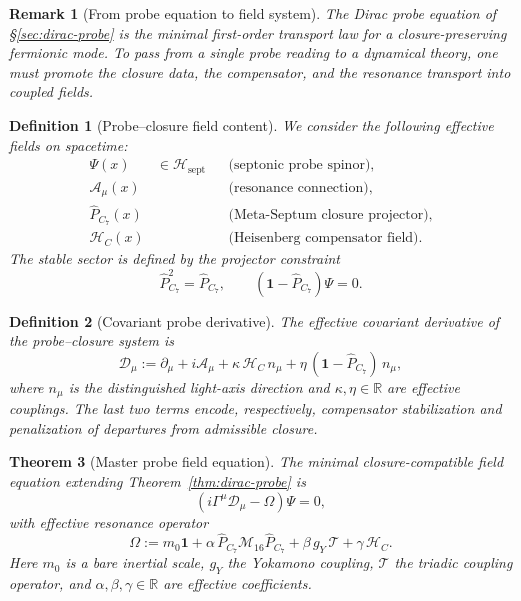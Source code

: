 \documentclass[12pt,a4paper]{article}
\newtheorem{theorem}{Theorem}[section]
\newtheorem{definition}[theorem]{Definition}
\newtheorem*{remark}{Remark}
\begin{document}
\begin{remark}[From probe equation to field system]
The Dirac probe equation of \S\ref{sec:dirac-probe} is the minimal
first-order transport law for a closure-preserving fermionic mode.
To pass from a single probe reading to a dynamical theory, one must
promote the closure data, the compensator, and the resonance transport
into coupled fields.
\end{remark}

\begin{definition}[Probe--closure field content]
We consider the following effective fields on spacetime:
\begin{align*}
  \Psi(x) &\in \mathcal H_{\mathrm{sept}}
    &&\text{(septonic probe spinor)},\\
  \mathcal A_\mu(x)
    &&&\text{(resonance connection)},\\
  \hat P_{C_7}(x)
    &&&\text{(Meta-Septum closure projector)},\\
  \mathcal H_C(x)
    &&&\text{(Heisenberg compensator field)}.
\end{align*}
The stable sector is defined by the projector constraint
\[
  \hat P_{C_7}^2 = \hat P_{C_7},
  \qquad
  (\mathbf 1-\hat P_{C_7})\Psi = 0.
\]
\end{definition}

\begin{definition}[Covariant probe derivative]
The effective covariant derivative of the probe--closure system is
\[
  \mathcal D_\mu
  :=
  \partial_\mu
  + i\mathcal A_\mu
  + \kappa\,\mathcal H_C\,n_\mu
  + \eta\,(\mathbf 1-\hat P_{C_7})\,n_\mu,
\]
where $n_\mu$ is the distinguished light-axis direction and
$\kappa,\eta\in\mathbb R$ are effective couplings.
The last two terms encode, respectively, compensator stabilization and
penalization of departures from admissible closure.
\end{definition}

\begin{theorem}[Master probe field equation]
\label{thm:master-field-equation}
The minimal closure-compatible field equation extending
Theorem~\ref{thm:dirac-probe} is
\[
  \left(
    i\Gamma^\mu\mathcal D_\mu
    - \Omega
  \right)\Psi = 0,
\]
with effective resonance operator
\[
  \Omega
  :=
  m_0\mathbf 1
  + \alpha\,\hat P_{C_7}\mathcal M_{16}\hat P_{C_7}
  + \beta\,g_Y\,\mathcal T
  + \gamma\,\mathcal H_C.
\]
Here $m_0$ is a bare inertial scale, $g_Y$ the Yokamono coupling,
$\mathcal T$ the triadic coupling operator, and
$\alpha,\beta,\gamma\in\mathbb R$ are effective coefficients.
\end{theorem}
\end{document}

